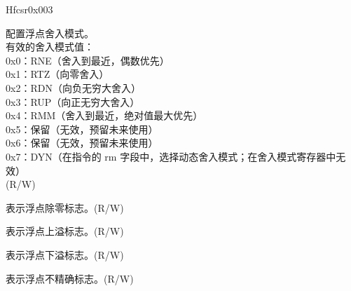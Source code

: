 \begin{register}{H}{fcsr}{0x003}\label{regdesc:FCSR}
%
%
%
%
%
%
%
\regnewline%
\begin{regdesc}\begin{reglist}
\label{fielddesc:FCSR_FRM}\item [FRM] 配置浮点舍入模式。\\
有效的舍入模式值：\\
0x0：RNE（舍入到最近，偶数优先）\\
0x1：RTZ（向零舍入）\\
0x2：RDN（向负无穷大舍入）\\
0x3：RUP（向正无穷大舍入）\\
0x4：RMM（舍入到最近，绝对值最大优先）\\
0x5：保留（无效，预留未来使用） \\
0x6：保留（无效，预留未来使用） \\
0x7：DYN（在指令的 rm 字段中，选择动态舍入模式；在舍入模式寄存器中无效）\\
(R/W)
\label{fielddesc:FCSR_FFLAGS_DZ}\item [DZ] 表示浮点除零标志。(R/W)
\label{fielddesc:FCSR_FFLAGS_OF}\item [OF] 表示浮点上溢标志。(R/W)
\label{fielddesc:FCSR_FFLAGS_UF}\item [UF] 表示浮点下溢标志。(R/W)
\label{fielddesc:FCSR_FFLAGS_NX}\item [NX] 表示浮点不精确标志。(R/W)
\end{reglist}\end{regdesc}
\end{register}

